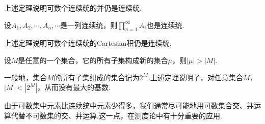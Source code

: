 \begin{remark}
	上述定理说明{\heiti 可数个连续统的并仍是连续统}.
\end{remark}
\begin{theorem}
	设$A_1,A_2,\cdots,A_n,\cdots$是一列连续统，则$\prod\limits_{n=1}^{\infty}A_i$也是连续统.
\end{theorem}
\begin{remark}
	上述定理说明{\heiti 可数个连续统的Cartesian积仍是连续统}.
\end{remark}
\begin{theorem}
	设$M$是任意的一个集合，它的所有子集构成新的集合$\mu$，则$|\mu|>|M|$.
\end{theorem}
一般地，集合$M$的所有子集组成的集合记为$2^M$.上述定理说明了，对任意集合$M$，$|M|<|2^M|$，从而没有最大的基数.

由于可数集中元素比连续统中元素少得多，我们通常尽可能地用可数集合交、并运算代替不可数集的交、并运算.这一点，在测度论中有十分重要的应用.